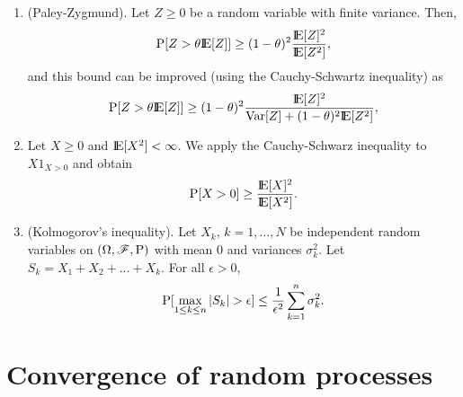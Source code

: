 \documentclass[a4paper,10pt]{article}
\begin{document}
\begin{enumerate}
\item (Paley-Zygmund). Let $Z\geq 0$ be a random variable with finite variance. Then,
      \[
       \prob[Z > \theta \E[Z]] \geq (1-\theta)^2\frac{\E[Z]^2}{\E[Z^2]},
      \]
     and this bound can be improved (using the Cauchy-Schwartz inequality) as
     \[
       \prob[Z > \theta \E[Z]] \geq (1-\theta)^2\frac{\E[Z]^2}{\mathrm{Var}[Z]+(1-\theta)^2\E[Z^2]},
      \]
\item Let $X\geq 0$ and $\E[X^2]<\infty$. We apply the Cauchy-Schwarz inequality to $X1_{X>0}$ and obtain
      \[
       \prob[X>0] \geq \frac{\E[X]^2}{\E[X^2]}.
      \]

\item (Kolmogorov's inequality). Let $X_k$, $k=1,\ldots, N$ be independent random variables on $(\Omega,\mathscr{F},\mathrm{P})$
      with mean $0$ and variances $\sigma_k^2$. Let $S_k = X_1 + X_2 + \ldots + X_k$. For all $\epsilon>0$,
      \[
       \prob[\max_{1\leq k\leq n}|S_k|>\epsilon] \leq \frac{1}{\epsilon^2}\sum_{k=1}^{n}\sigma_k^2.
      \]


\end{enumerate}


\section{Convergence of random processes}
\end{document}
